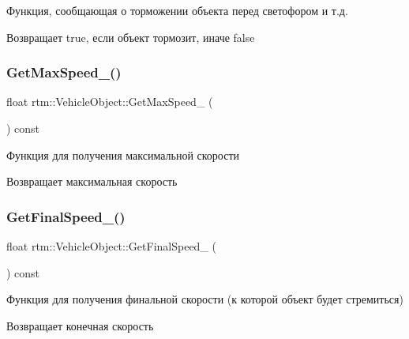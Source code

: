Функция, сообщающая о торможении объекта перед светофором и т.\+д. \begin{DoxyReturn}{Возвращает}
true, если объект тормозит, иначе false 
\end{DoxyReturn}
\mbox{\label{classrtm_1_1_vehicle_object_ad0dd345b8c1d7913034aaf3267ee4a03}} 
\subsubsection{\texorpdfstring{Get\+Max\+Speed\+\_\+()}{GetMaxSpeed\_()}}
{\footnotesize\ttfamily float rtm\+::\+Vehicle\+Object\+::\+Get\+Max\+Speed\+\_\+ (\begin{DoxyParamCaption}{ }\end{DoxyParamCaption}) const\hspace{0.3cm}{\ttfamily [protected]}}

Функция для получения максимальной скорости \begin{DoxyReturn}{Возвращает}
максимальная скорость 
\end{DoxyReturn}
\mbox{\label{classrtm_1_1_vehicle_object_a6cf4eb12c1eaf80b7f1e95ab206deae9}} 
\subsubsection{\texorpdfstring{Get\+Final\+Speed\+\_\+()}{GetFinalSpeed\_()}}
{\footnotesize\ttfamily float rtm\+::\+Vehicle\+Object\+::\+Get\+Final\+Speed\+\_\+ (\begin{DoxyParamCaption}{ }\end{DoxyParamCaption}) const\hspace{0.3cm}{\ttfamily [protected]}}

Функция для получения финальной скорости (к которой объект будет стремиться) \begin{DoxyReturn}{Возвращает}
конечная скорость 
\end{DoxyReturn}
\mbox{\label{classrtm_1_1_vehicle_object_a0339478b106ebe22b63a6d076204cc22}} 
